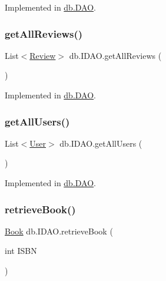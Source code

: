 Implemented in \hyperlink{classdb_1_1_d_a_o_a82a8c60ccd0de2f70b69bc36d29aeef8}{db.\+D\+AO}.

\mbox{\label{interfacedb_1_1_i_d_a_o_a3d9625d7e5426aad3c2e70fd0174e5f0}} 
\subsubsection{\texorpdfstring{get\+All\+Reviews()}{getAllReviews()}}
{\footnotesize\ttfamily List$<$\hyperlink{classserver_1_1data_1_1_review}{Review}$>$ db.\+I\+D\+A\+O.\+get\+All\+Reviews (\begin{DoxyParamCaption}{ }\end{DoxyParamCaption})}



Implemented in \hyperlink{classdb_1_1_d_a_o_a4df79c7d44b050aa55451db2ecf342f6}{db.\+D\+AO}.

\mbox{\label{interfacedb_1_1_i_d_a_o_a88b60729d9517ca9aa31b7db7ae07aee}} 
\subsubsection{\texorpdfstring{get\+All\+Users()}{getAllUsers()}}
{\footnotesize\ttfamily List$<$\hyperlink{classserver_1_1data_1_1_user}{User}$>$ db.\+I\+D\+A\+O.\+get\+All\+Users (\begin{DoxyParamCaption}{ }\end{DoxyParamCaption})}



Implemented in \hyperlink{classdb_1_1_d_a_o_a3b627b7177990799fd02e0c38b8adb70}{db.\+D\+AO}.

\mbox{\label{interfacedb_1_1_i_d_a_o_a1457ecf91799eaacd17cd3259826fc36}} 
\subsubsection{\texorpdfstring{retrieve\+Book()}{retrieveBook()}}
{\footnotesize\ttfamily \hyperlink{classserver_1_1data_1_1_book}{Book} db.\+I\+D\+A\+O.\+retrieve\+Book (\begin{DoxyParamCaption}\item[{int}]{I\+S\+BN }\end{DoxyParamCaption})}



